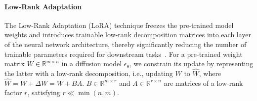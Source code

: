 \vspace{-10pt}
\paragraph{Low-Rank Adaptation}
The Low-Rank Adaptation (LoRA) technique freezes the pre-trained model weights and introduces trainable low-rank decomposition matrices into each layer of the neural network architecture, thereby significantly reducing the number of trainable parameters required for downstream tasks~\citep{lora}. For a pre-trained weight matrix $W \in \mathbb{R}^{m\times n}$ in a diffusion model $\epsilon_{\theta}$, we constrain its update by representing the latter with a low-rank decomposition, i.e., updating $W$ to $\hat W$, where $\hat W=W+\Delta W = W+BA$. $B \in \mathbb{R}^{m\times r}$ and $A \in \mathbb{R}^{r\times n}$ are matrices of a low-rank factor $r$, satisfying $r \ll \min(n, m)$.
\vspace{-8pt}

